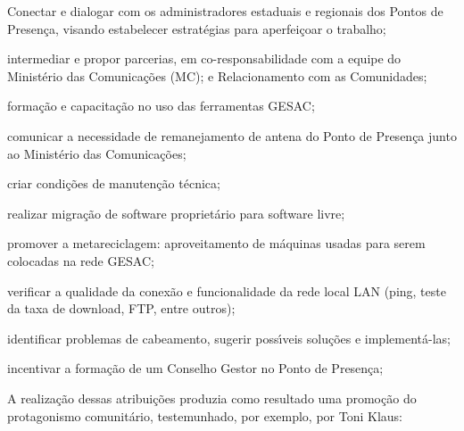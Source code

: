 \documentclass[
12pt,		%
openright,	%
twoside,  %
a4paper,			%
chapter=TITLE,		%
english,			%
french,				%
spanish,			%
brazil				%
]{USPSC-classe/USPSC}
\begin{document}
\begin{alineas}
\item Conectar e dialogar com os administradores estaduais e regionais dos Pontos de Presen\c{c}a, visando estabelecer estrat\'egias para aperfei\c{c}oar o trabalho;
\item intermediar e propor parcerias, em co-responsabilidade com a equipe do Minist\'erio das Comunica\c{c}\~oes (MC); e Relacionamento com as Comunidades;
\item forma\c{c}\~ao e capacita\c{c}\~ao no uso das ferramentas GESAC;
\item comunicar a  necessidade de remanejamento de antena  do Ponto de Presen\c{c}a junto ao Minist\'erio das Comunica\c{c}\~oes;
\item criar condi\c{c}\~oes de manuten\c{c}\~ao t\'ecnica;
\item realizar migra\c{c}\~ao de software propriet\'ario para software livre;
\item promover a metareciclagem: aproveitamento de m\'aquinas usadas para serem colocadas na rede GESAC;
\item verificar a qualidade da conex\~ao e  funcionalidade da rede local LAN (ping, teste da taxa de download, FTP, entre outros);
\item identificar problemas de cabeamento, sugerir poss\'{\i}veis solu\c{c}\~oes e implement\'a-las;
\item incentivar a forma\c{c}\~ao de um Conselho Gestor no Ponto de Presen\c{c}a;
\end{alineas}

A realiza\c{c}\~ao dessas atribui\c{c}\~oes produzia como resultado uma promo\c{c}\~ao do protagonismo comunit\'ario, testemunhado, por exemplo, por Toni Klaus:


















\noindent\begin{center}\mbox{\centering{}}\end{center}
\end{document}
